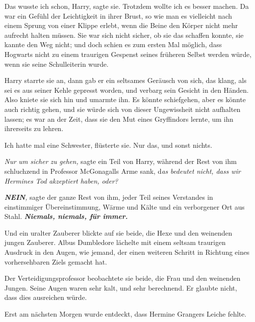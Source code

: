 \glqq{}Das wusste ich schon, Harry\grqq{}, sagte sie. \glqq{}Trotzdem wollte ich
es besser machen.\grqq{} Da war ein Gefühl der Leichtigkeit in ihrer Brust, so
wie man es vielleicht nach einem Sprung von einer Klippe erlebt, wenn die Beine
den Körper nicht mehr aufrecht halten müssen. Sie war sich nicht sicher, ob sie
das schaffen konnte, sie kannte den Weg nicht; und doch schien es zum ersten Mal
möglich, dass Hogwarts nicht zu einem traurigen Gespenst seines früheren Selbst
werden würde, wenn sie seine Schulleiterin wurde.

Harry starrte sie an, dann gab er ein seltsames Geräusch von sich, das klang,
als sei es aus seiner Kehle gepresst worden, und verbarg sein Gesicht in den
Händen. Also kniete sie sich hin und umarmte ihn. Es könnte schiefgehen, aber es
könnte auch richtig gehen, und sie würde sich von dieser Ungewissheit nicht
aufhalten lassen; es war an der Zeit, dass sie den Mut eines Gryffindors lernte,
um ihn ihrerseits zu lehren.

\glqq{}Ich hatte mal eine Schwester\grqq{}, flüsterte sie. Nur das, und sonst
nichts.

\emph{Nur um sicher zu gehen,} sagte ein Teil von Harry, während der Rest von
ihm schluchzend in Professor McGonagalls Arme sank, d\emph{as bedeutet nicht,
dass wir Hermines Tod akzeptiert haben, oder?}

\textbf{\emph{NEIN}}\emph{,} sagte der ganze Rest von ihm, jeder Teil seines
Verstandes in einstimmiger Übereinstimmung, Wärme und Kälte und ein verborgener
Ort aus Stahl. \textbf{\emph{Niemals, niemals, für immer.}}

Und ein uralter Zauberer blickte auf sie beide, die Hexe und den weinenden
jungen Zauberer. Albus Dumbledore lächelte mit einem seltsam traurigen Ausdruck
in den Augen, wie jemand, der einen weiteren Schritt in Richtung eines
vorhersehbaren Ziels gemacht hat.

Der Verteidigungsprofessor beobachtete sie beide, die Frau und den weinenden
Jungen. Seine Augen waren sehr kalt, und sehr berechnend. Er glaubte nicht, dass
dies ausreichen würde.

Erst am nächsten Morgen wurde entdeckt, dass Hermine Grangers Leiche fehlte.

